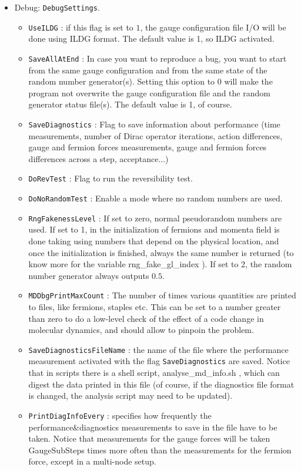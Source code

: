 \begin{itemize}
\item{Debug: \verb|DebugSettings|.}
\begin{itemize}
 \item \verb|UseILDG| : if this flag is set to $1$, the gauge configuration 
file  I/O will be done using ILDG format. The default value is 1, so ILDG 
activated.
 \item \verb|SaveAllAtEnd| : In case you want to reproduce a bug, you want to 
start from the same gauge configuration and from the same state of the random 
number generator(s). Setting this option to 0 will make the program not 
overwrite the gauge configuration file and the random generator status file(s). 
The default value is 1, of course.
 \item \verb|SaveDiagnostics| : Flag to save information about performance (time measurements, number of Dirac operator iterations, action differences, gauge and
 fermion forces measurements, gauge and fermion forces differences across a step, acceptance...)
 \item \verb|DoRevTest| : Flag to run the reversibility test.
 \item \verb|DoNoRandomTest| : Enable a mode where no random numbers are used.
 \item \verb|RngFakenessLevel| : If set to zero, normal pseudorandom numbers are used. 
 If set to 1, in the initialization of fermions and momenta field is done taking using numbers that depend on the physical location, and once the initialization is finished, always the same number is returned (to know more for the variable {\sf rng\_fake\_gl\_index }). If set to 2, the random number generator always outputs $0.5$.
 \item \verb|MDDbgPrintMaxCount| : The number of times various quantities are printed to files, like fermions, staples etc. This can be set to a number greater than zero to do a low-level check of the effect of a code change in molecular dynamics, and should allow to pinpoin the problem.
 \item \verb|SaveDiagnosticsFileName| : the name of the file where the performance measurement activated with the flag \verb|SaveDiagnostics| are saved. Notice that in {\sf scripts} there is a shell script, {\sf analyse\_md\_info.sh }, which can digest the data printed in this file (of course, if the diagnostics file format is changed, the analysis script may need to be updated).
 \item \verb|PrintDiagInfoEvery| : specifies how frequently the performance\&diagnostics
 measurements to save in the file have to be taken. Notice that measurements for the gauge forces will be taken {\sf GaugeSubSteps} times more often than the measurements for the fermion force, except in a multi-node setup.
\end{itemize}


\end{itemize}
